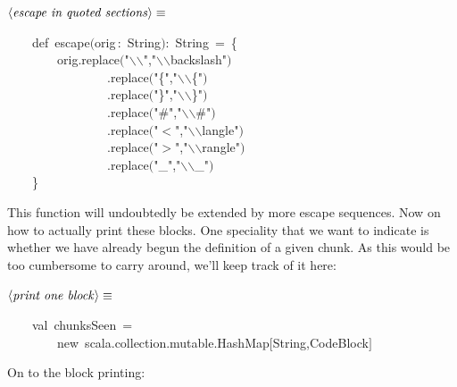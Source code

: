 \documentclass[a4paper,12pt]{article}
\begin{document}
$\left<\mbox{\emph{escape in quoted sections}}\right>\equiv$
\begin{program}~~~~{\vem def}~escape$($orig\,{\rm :}~String$)${\rm :}~String~=~{\small\{}
\\~~~~~~~~orig.replace$($"$\backslash$$\backslash$","\Dollar$\backslash$$\backslash$backslash\Dollar"$)$
\\~~~~~~~~~~~~~~~~.replace$($"{\small\{}","\Dollar$\backslash$$\backslash${\small\{}\Dollar"$)$
\\~~~~~~~~~~~~~~~~.replace$($"{\small\}}","\Dollar$\backslash$$\backslash${\small\}}\Dollar"$)$
\\~~~~~~~~~~~~~~~~.replace$($"\#","\Dollar$\backslash$$\backslash$\#\Dollar"$)$
\\~~~~~~~~~~~~~~~~.replace$($"$<$","\Dollar$\backslash$$\backslash$langle\Dollar"$)$
\\~~~~~~~~~~~~~~~~.replace$($"$>$","\Dollar$\backslash$$\backslash$rangle\Dollar"$)$
\\~~~~~~~~~~~~~~~~.replace$($"\_","$\backslash$$\backslash$\_"$)$
\\~~~~{\small\}}
\\[0.5em]\end{program}
This function will undoubtedly be extended by more escape sequences. Now on
how to actually print these blocks. One speciality that we want to indicate
is whether we have already begun the definition of a given chunk. As this
would be too cumbersome to carry around, we'll keep track of it here:

$\left<\mbox{\emph{print one block}}\right>\equiv$
\begin{program}~~~~{\vem val}~chunksSeen~=
\\~~~~~~~~{\vem new}~scala.collection.mutable.HashMap$[$String,CodeBlock$]$
\\[0.5em]\end{program}
On to the block printing:
\end{document}
